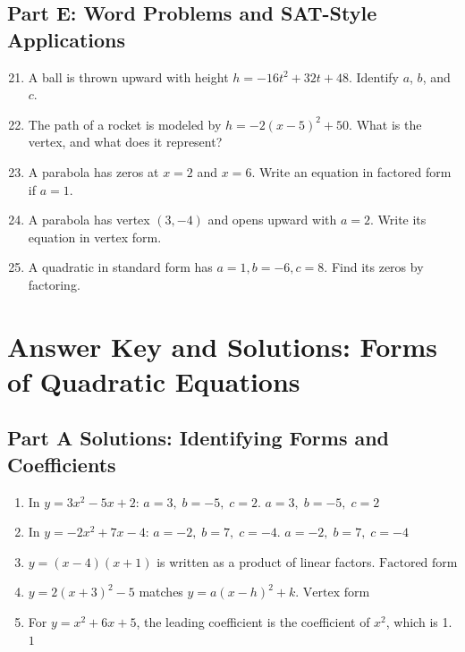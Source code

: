 \documentclass[14pt]{extarticle}
\begin{document}
\subsection*{Part E: Word Problems and SAT-Style Applications}
\begin{enumerate}
  \setcounter{enumi}{20}
  \item A ball is thrown upward with height \(h = -16t^2 + 32t + 48\). Identify \(a\), \(b\), and \(c\).
  \item The path of a rocket is modeled by \(h = -2(x - 5)^2 + 50\). What is the vertex, and what does it represent?
  \item A parabola has zeros at \(x = 2\) and \(x = 6\). Write an equation in factored form if \(a = 1.\)
  \item A parabola has vertex \((3, -4)\) and opens upward with \(a = 2\). Write its equation in vertex form.
  \item A quadratic in standard form has \(a = 1, b = -6, c = 8.\) Find its zeros by factoring.
\end{enumerate}

\newpage


\section*{Answer Key and Solutions: Forms of Quadratic Equations}

\subsection*{Part A Solutions: Identifying Forms and Coefficients}
\begin{enumerate}
  \item In \(y = 3x^2 - 5x + 2\):  
  \(a = 3,\; b = -5,\; c = 2.\)  
  \(\boxed{a=3,\; b=-5,\; c=2}\)

  \item In \(y = -2x^2 + 7x - 4\):  
  \(a = -2,\; b = 7,\; c = -4.\)  
  \(\boxed{a=-2,\; b=7,\; c=-4}\)

  \item \(y = (x - 4)(x + 1)\) is written as a product of linear factors.  
  \(\boxed{\text{Factored form}}\)

  \item \(y = 2(x + 3)^2 - 5\) matches \(y = a(x - h)^2 + k.\)  
  \(\boxed{\text{Vertex form}}\)

  \item For \(y = x^2 + 6x + 5\), the leading coefficient is the coefficient of \(x^2\), which is 1.  
  \(\boxed{1}\)
\end{enumerate}
\end{document}
